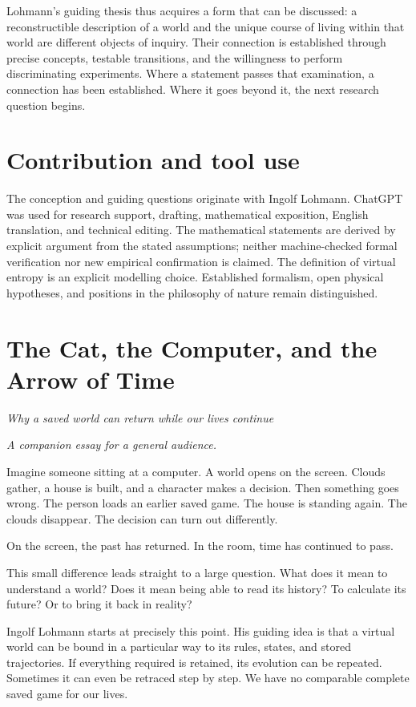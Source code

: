 Lohmann's guiding thesis thus acquires a form that can be discussed: a reconstructible description of a world and the unique course of living within that world are different objects of inquiry. Their connection is established through precise concepts, testable transitions, and the willingness to perform discriminating experiments. Where a statement passes that examination, a connection has been established. Where it goes beyond it, the next research question begins.

\section*{Contribution and tool use}
The conception and guiding questions originate with Ingolf Lohmann. ChatGPT was used for research support, drafting, mathematical exposition, English translation, and technical editing. The mathematical statements are derived by explicit argument from the stated assumptions; neither machine-checked formal verification nor new empirical confirmation is claimed. The definition of virtual entropy is an explicit modelling choice. Established formalism, open physical hypotheses, and positions in the philosophy of nature remain distinguished.
\clearpage
\appendix
\renewcommand{\theHsection}{\langtag.appendix.\Alph{section}}
\section{The Cat, the Computer, and the Arrow of Time}
\label{en:essay}
\noindent\emph{Why a saved world can return while our lives continue}\par\smallskip
\noindent\textit{A companion essay for a general audience.}\par\medskip
Imagine someone sitting at a computer. A world opens on the screen. Clouds gather, a house is built, and a character makes a decision. Then something goes wrong. The person loads an earlier saved game. The house is standing again. The clouds disappear. The decision can turn out differently.

On the screen, the past has returned. In the room, time has continued to pass.

This small difference leads straight to a large question. What does it mean to understand a world? Does it mean being able to read its history? To calculate its future? Or to bring it back in reality?

Ingolf Lohmann starts at precisely this point. His guiding idea is that a virtual world can be bound in a particular way to its rules, states, and stored trajectories. If everything required is retained, its evolution can be repeated. Sometimes it can even be retraced step by step. We have no comparable complete saved game for our lives.

